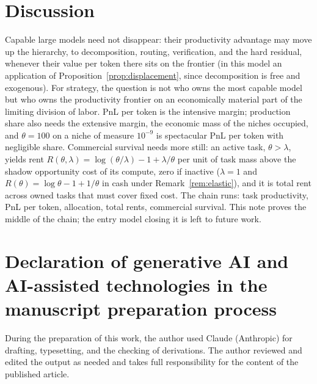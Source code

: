 \documentclass[preprint,11pt,authoryear]{elsarticle}
\begin{document}
\section{Discussion}
\label{sec:discussion}

Capable large models need not disappear: their productivity advantage may move up the hierarchy, to decomposition, routing, verification, and the hard residual, whenever their value per token there sits on the frontier (in this model an application of Proposition~\ref{prop:displacement}, since decomposition is free and exogenous). For strategy, the question is not who owns the most capable model but who owns the productivity frontier on an economically material part of the limiting division of labor. PnL per token is the intensive margin; production share also needs the extensive margin, the economic mass of the niches occupied, and $\theta = 100$ on a niche of measure $10^{-9}$ is spectacular PnL per token with negligible share. Commercial survival needs more still: an active task, $\theta > \lambda$, yields rent $R(\theta,\lambda) = \log(\theta/\lambda) - 1 + \lambda/\theta$ per unit of task mass above the shadow opportunity cost of its compute, zero if inactive ($\lambda = 1$ and $R(\theta) = \log\theta - 1 + 1/\theta$ in cash under Remark~\ref{rem:elastic}), and it is total rent across owned tasks that must cover fixed cost. The chain runs: task productivity, PnL per token, allocation, total rents, commercial survival. This note proves the middle of the chain; the entry model closing it is left to future work.

\section*{Declaration of generative AI and AI-assisted technologies in the manuscript preparation process}

During the preparation of this work, the author used Claude (Anthropic) for drafting, typesetting, and the checking of derivations. The author reviewed and edited the output as needed and takes full responsibility for the content of the published article.


\end{document}
